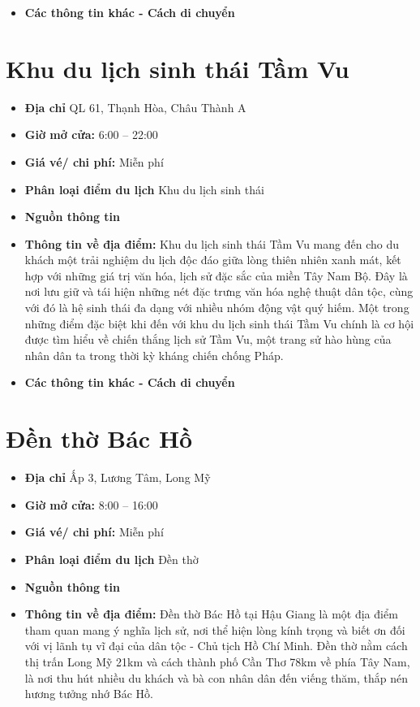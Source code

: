 \documentclass{article}
\begin{document}
\begin{itemize}
    \item{\textbf{Các thông tin khác - Cách di chuyển}}
\end{itemize}

\section{Khu du lịch sinh thái Tầm Vu}
\begin{itemize}
    \item{\textbf{Địa chỉ}} QL 61, Thạnh Hòa, Châu Thành A
    \item{\textbf{Giờ mở cửa:}} 6:00 – 22:00
    \item{\textbf{Giá vé/ chi phí:}} Miễn phí
    \item{\textbf{Phân loại điểm du lịch} } Khu du lịch sinh thái
    \item{\textbf{Nguồn thông tin}}
    \item{\textbf{Thông tin về địa điểm:}} Khu du lịch sinh thái Tầm Vu mang đến cho du khách một trải nghiệm du lịch độc đáo giữa lòng thiên nhiên xanh mát, kết hợp với những giá trị văn hóa, lịch sử đặc sắc của miền Tây Nam Bộ. Đây là nơi lưu giữ và tái hiện những nét đặc trưng văn hóa nghệ thuật dân tộc, cùng với đó là hệ sinh thái đa dạng với nhiều nhóm động vật quý hiếm. Một trong những điểm đặc biệt khi đến với khu du lịch sinh thái Tầm Vu chính là cơ hội được tìm hiểu về chiến thắng lịch sử Tầm Vu, một trang sử hào hùng của nhân dân ta trong thời kỳ kháng chiến chống Pháp.
\end{itemize}

\begin{itemize}
    \item{\textbf{Các thông tin khác - Cách di chuyển}}
\end{itemize}

\section{Đền thờ Bác Hồ}
\begin{itemize}
    \item{\textbf{Địa chỉ}} Ấp 3, Lương Tâm, Long Mỹ
    \item{\textbf{Giờ mở cửa:}} 8:00 – 16:00
    \item{\textbf{Giá vé/ chi phí:}} Miễn phí
    \item{\textbf{Phân loại điểm du lịch} } Đền thờ
    \item{\textbf{Nguồn thông tin}}
    \item{\textbf{Thông tin về địa điểm:}} Đền thờ Bác Hồ tại Hậu Giang là một địa điểm tham quan mang ý nghĩa lịch sử, nơi thể hiện lòng kính trọng và biết ơn đối với vị lãnh tụ vĩ đại của dân tộc - Chủ tịch Hồ Chí Minh. Đền thờ nằm cách thị trấn Long Mỹ 21km và cách thành phố Cần Thơ 78km về phía Tây Nam, là nơi thu hút nhiều du khách và bà con nhân dân đến viếng thăm, thắp nén hương tưởng nhớ Bác Hồ.
\end{itemize}
\end{document}
